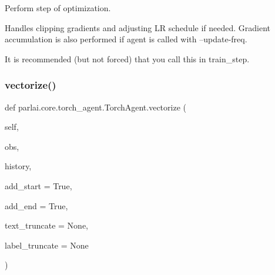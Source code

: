 \begin{DoxyVerb}Perform step of optimization.

Handles clipping gradients and adjusting LR schedule if needed.
Gradient accumulation is also performed if agent is called with
--update-freq.

It is recommended (but not forced) that you call this in train_step.
\end{DoxyVerb}
 \mbox{\label{classparlai_1_1core_1_1torch__agent_1_1TorchAgent_a48bb9b153353a0565ab7253dc1daef99}} 
\subsubsection{\texorpdfstring{vectorize()}{vectorize()}}
{\footnotesize\ttfamily def parlai.\+core.\+torch\+\_\+agent.\+Torch\+Agent.\+vectorize (\begin{DoxyParamCaption}\item[{}]{self,  }\item[{}]{obs,  }\item[{}]{history,  }\item[{}]{add\+\_\+start = {\ttfamily True},  }\item[{}]{add\+\_\+end = {\ttfamily True},  }\item[{}]{text\+\_\+truncate = {\ttfamily None},  }\item[{}]{label\+\_\+truncate = {\ttfamily None} }\end{DoxyParamCaption})}

